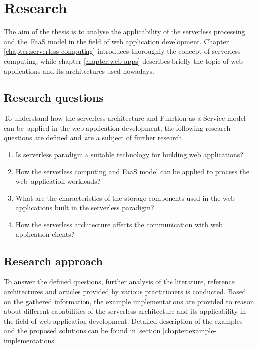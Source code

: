 \newpage

\section{Research}

The aim of the thesis is to analyse the applicability of the serverless processing and the~FaaS model in the field of web application development. Chapter \ref{chapter:serverless-computing} introduces thoroughly the concept of serverless computing, while chapter \ref{chapter:web-apps} describes briefly the topic of web applications and its architectures used nowadays. 

\subsection{Research questions} \label{section:research-questions}

To understand how the serverless architecture and Function as a Service model can be~applied in the web application development, the following research questions are defined and~are a subject of further research.

\begin{enumerate}
    \item Is serverless paradigm a suitable technology for building web applications?
    \item How the serverless computing and FaaS model can be applied to process the web~application workloads?
    \item What are the characteristics of the storage components used in the web applications built in the serverless paradigm?
    \item How the serverless architecture affects the communication with web application clients?
\end{enumerate}

\subsection{Research approach} \label{section:research-approach}

To answer the defined questions, further analysis of the literature, reference architectures and articles provided by various practitioners is conducted.
Based on the gathered information, the example implementations are provided to reason about different capabilities of the serverless architecture and its applicability in the field of web application development.
Detailed description of the examples and the proposed solutions can be found in~section \ref{chapter:example-implementations}.

